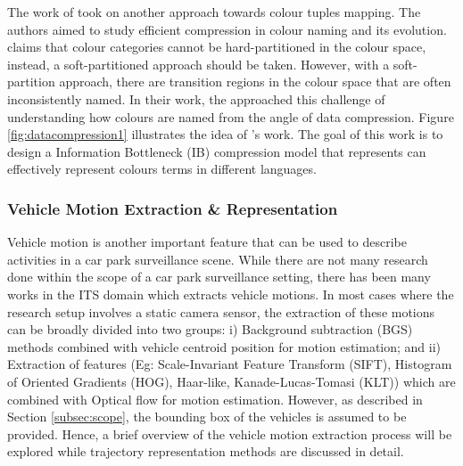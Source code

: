 The work of \cite{zaslavsky2018efficient} took on another approach towards
colour tuples mapping. The authors aimed to study efficient compression in
colour naming and its evolution.  claims that
colour categories cannot be hard-partitioned in the colour space, instead, a
soft-partitioned approach should be taken. However, with a soft-partition
approach, there are transition regions in the colour space that are often
inconsistently named. In their work, the approached this challenge of
understanding how colours are named from the angle of data compression. Figure
\ref{fig:datacompression1} illustrates the idea of
's work. The goal of this work is to design a
Information Bottleneck (IB) compression model that represents can effectively
represent colours terms in different languages.

\subsubsection{Vehicle Motion Extraction \& Representation}
\label{subsec:vehiclemotionextraction}

Vehicle motion is another important feature that can be used to describe
activities in a car park surveillance scene. While there are not many research
done within the scope of a car park surveillance setting, there has been many
works in the ITS domain which extracts vehicle motions.
In most cases where the research setup involves a static camera sensor,
the extraction of these motions can be broadly divided into two groups:
i) Background subtraction (BGS) methods combined with vehicle centroid
position for motion estimation; and ii) Extraction of features
(Eg: Scale-Invariant Feature Transform (SIFT), Histogram of Oriented Gradients
(HOG), Haar-like, Kanade-Lucas-Tomasi (KLT)) which are combined with Optical
flow for motion estimation. However, as described in Section
\ref{subsec:scope}, the bounding box of the vehicles is assumed to be provided.
Hence, a brief overview of the vehicle motion extraction process will
be explored while trajectory representation methods are discussed in detail.


